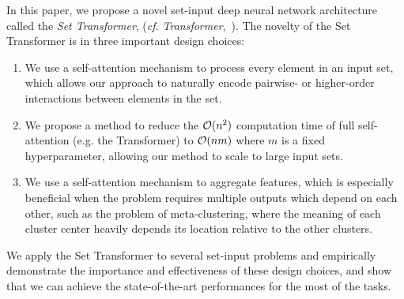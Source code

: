

In this paper, we propose a novel set-input deep neural network architecture called the \emph{Set Transformer}, (\textit{cf.} \emph{Transformer},~\cite{Vaswani2017}).
The novelty of the Set Transformer is in three important design choices:
\begin{enumerate}
\item We use a self-attention mechanism to process every element in an input set, which allows our approach to naturally encode pairwise- or higher-order interactions between elements in the set.
\item We propose a method to reduce the $\mathcal{O}(n^2)$ computation time of full self-attention (e.g. the Transformer) to $\mathcal{O}(nm)$ where $m$ is a fixed hyperparameter, allowing our method to scale to large input sets.
\item We use a self-attention mechanism to aggregate features, which is especially beneficial when the problem requires multiple outputs which depend on each other, such as the problem of meta-clustering, where the meaning of each cluster center heavily depends its location relative to the other clusters.
\end{enumerate}
We apply the Set Transformer to several set-input problems and empirically demonstrate the  importance and effectiveness of these design choices, and show that we can achieve the state-of-the-art performances for the most of the tasks.


